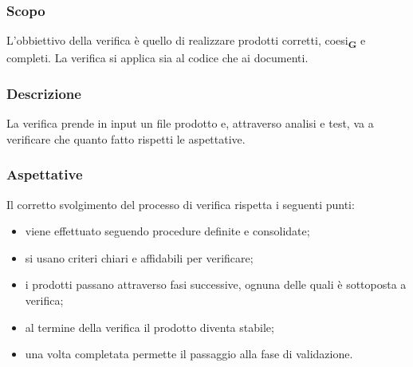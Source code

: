 \subsubsection{Scopo}
L'obbiettivo della verifica è quello di realizzare prodotti corretti, coesi\textsubscript{\textbf{G}} e completi. La verifica si applica sia al codice che ai documenti.
\subsubsection{Descrizione}
La verifica prende in input un file prodotto e, attraverso analisi e test, va a verificare che quanto fatto rispetti le aspettative.
\subsubsection{Aspettative}
Il corretto svolgimento del processo di verifica rispetta i seguenti punti:
\begin{itemize}
    \item viene effettuato seguendo procedure definite e consolidate;
    \item si usano criteri chiari e affidabili per verificare;
    \item i prodotti passano attraverso fasi successive, ognuna delle quali è sottoposta a verifica;
    \item al termine della verifica il prodotto diventa stabile;
    \item una volta completata permette il passaggio alla fase di validazione.
\end{itemize}
